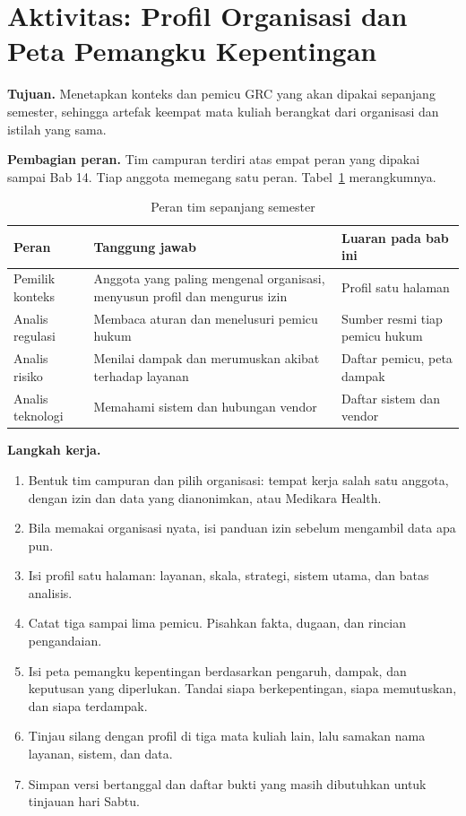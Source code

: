 \section{Aktivitas: Profil Organisasi dan Peta Pemangku Kepentingan}

\textbf{Tujuan.} Menetapkan konteks dan pemicu GRC yang akan dipakai sepanjang semester,
sehingga artefak keempat mata kuliah berangkat dari organisasi dan istilah yang sama.

\textbf{Pembagian peran.} Tim campuran terdiri atas empat peran yang dipakai sampai Bab 14.
Tiap anggota memegang satu peran. Tabel~\ref{tab:ch01-peran-tim} merangkumnya.

\begin{table}[!htb]
  \centering\small
  \caption{Peran tim sepanjang semester}\label{tab:ch01-peran-tim}
  \begin{tabularx}{\textwidth}{|>{\raggedright\arraybackslash}p{}|>{\raggedright\arraybackslash}X|>{\raggedright\arraybackslash}p{}|}
    \hline
    \textbf{Peran} & \textbf{Tanggung jawab} & \textbf{Luaran pada bab ini} \\ \hline
    Pemilik konteks & Anggota yang paling mengenal organisasi, menyusun profil dan mengurus
    izin & Profil satu halaman \\ \hline
    Analis regulasi & Membaca aturan dan menelusuri pemicu hukum & Sumber resmi tiap pemicu
    hukum \\ \hline
    Analis risiko & Menilai dampak dan merumuskan akibat terhadap layanan & Daftar pemicu,
    peta dampak \\ \hline
    Analis teknologi & Memahami sistem dan hubungan vendor & Daftar sistem dan vendor \\
    \hline
  \end{tabularx}
\end{table}

\textbf{Langkah kerja.}
\begin{enumerate}
  \item Bentuk tim campuran dan pilih organisasi: tempat kerja salah satu anggota, dengan
  izin dan data yang dianonimkan, atau Medikara Health.
  \item Bila memakai organisasi nyata, isi panduan izin sebelum mengambil data apa pun.
  \item Isi profil satu halaman: layanan, skala, strategi, sistem utama, dan batas analisis.
  \item Catat tiga sampai lima pemicu. Pisahkan fakta, dugaan, dan rincian pengandaian.
  \item Isi peta pemangku kepentingan berdasarkan pengaruh, dampak, dan keputusan yang
  diperlukan. Tandai siapa berkepentingan, siapa memutuskan, dan siapa terdampak.
  \item Tinjau silang dengan profil di tiga mata kuliah lain, lalu samakan nama layanan,
  sistem, dan data.
  \item Simpan versi bertanggal dan daftar bukti yang masih dibutuhkan untuk tinjauan hari
  Sabtu.
\end{enumerate}

